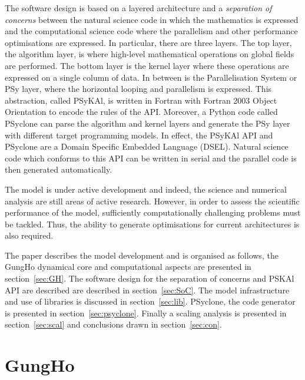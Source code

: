 \documentclass[review,times]{elsarticle}
\begin{document}
The software design is based on a layered architecture and a 
{\em separation of concerns} between the natural science code in which
the mathematics is expressed and the computational science code where the
parallelism and other performance optimisations are expressed. In particular,
there are three layers. The top layer, the algorithm layer, is where high-level mathematical 
operations on global fields are performed. The bottom layer is the kernel layer
where these operations are expressed on a single column of data. In between is the
Parallelisation System or PSy layer, where the horizontal looping and parallelism is
expressed. This abstraction, called PSyKAl, is written in Fortran with Fortran 2003
Object Orientation to encode the rules of the API.
Moreover, a Python code called PSyclone can parse the algorithm and kernel layers and
generate the PSy layer with different target programming models. In effect, the PSyKAl API
and PSyclone are a Domain Specific Embedded Language (DSEL). Natural science code which
conforms to this API can be written in serial and the parallel code is then generated automatically.

The model is under active development and indeed, the science and
numerical analysis are still areas of active research. However, in
order to assess the scientific performance of the model, sufficiently
computationally challenging problems must be tackled. Thus, the
ability to generate optimisations for current architectures is also
required. 

The paper describes the model development and is organised as follows,
the GungHo dynamical core and computational aspects are presented in
section~\ref{sec:GH}. The software design for the separation of
concerns and PSKAl API are described are described in
section~\ref{sec:SoC}. The model infrastructure and use of libraries
is discussed in section~\ref{sec:lib}. PSyclone, the code generator is
presented in section~\ref{sec:psyclone}. Finally a scaling analysis is
presented in section~\ref{sec:scal} and conclusions drawn in
section~\ref{sec:con}.

\section{\label{sec:GH}GungHo}
\end{document}
